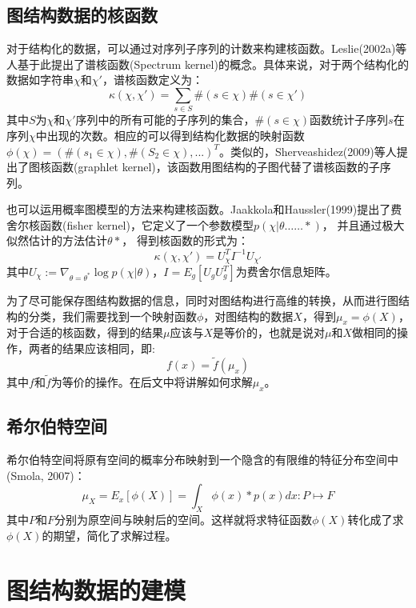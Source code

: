 \subsection{图结构数据的核函数}
对于结构化的数据，可以通过对序列子序列的计数来构建核函数。Leslie(2002a)等人基于此提出了谱核函数(Spectrum kernel)的概念。具体来说，对于两个结构化的数据如字符串$\chi$和$\chi'$，谱核函数定义为：
\begin{equation*}
\kappa(\chi, \chi') = \sum_{s\in S}\#(s\in \chi)\#(s \in \chi')
\end{equation*}
其中$S$为$\chi$和$\chi'$序列中的所有可能的子序列的集合，$\#(s\in \chi)$函数统计子序列$s$在序列$\chi$中出现的次数。相应的可以得到结构化数据的映射函数$\phi(\chi)=(\#(s_1\in \chi), \#(S_2\in \chi), ...)^T$。类似的，Sherveashidez(2009)等人提出了图核函数(graphlet kernel)，该函数用图结构的子图代替了谱核函数的子序列。
\par 也可以运用概率图模型的方法来构建核函数。Jaakkola和Haussler(1999)提出了费舍尔核函数(fisher kernel)，它定义了一个参数模型$p(\chi|\theta……*)$， 并且通过极大似然估计的方法估计$\theta*$， 得到核函数的形式为：
\begin{equation*}
\kappa(\chi, \chi') = U_\chi^TI^{-1}U_{\chi'}
\end{equation*}
其中$U_\chi := \nabla_{\theta=\theta^*}\log p(\chi|\theta)$，$I=E_g[U_gU_g^T]$为费舍尔信息矩阵。
\par 为了尽可能保存图结构数据的信息，同时对图结构进行高维的转换，从而进行图结构的分类，我们需要找到一个映射函数$\phi$，对图结构的数据$X$，得到$\mu_x = \phi(X)$，对于合适的核函数，得到的结果$\mu$应该与$X$是等价的，也就是说对$\mu$和$X$做相同的操作，两者的结果应该相同，即:
$$f(x)=\tilde{f}(\mu_x)$$
其中$f$和$\tilde{f}$为等价的操作。在后文中将讲解如何求解$\mu_x$。
\subsection{希尔伯特空间}
希尔伯特空间将原有空间的概率分布映射到一个隐含的有限维的特征分布空间中(Smola, 2007)：
$$\mu_X = E_x [\phi(X)] = \int_X \phi(x)*p(x)dx : P\mapsto F$$
其中$P$和$F$分别为原空间与映射后的空间。这样就将求特征函数$\phi(X)$转化成了求$\phi(X)$的期望，简化了求解过程。
\section{图结构数据的建模}
